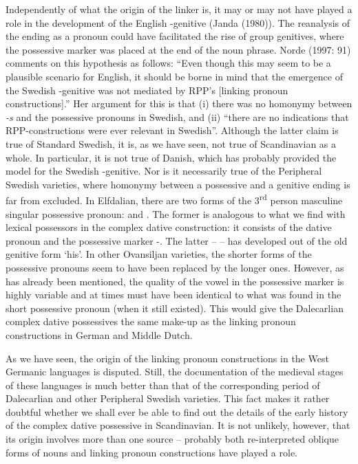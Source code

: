 Independently of what the origin of the linker is, it may or may not have played a role in the development of the English -genitive (Janda (1980)). The reanalysis of the ending as a pronoun could have facilitated the rise of group genitives, where the possessive marker was placed at the end of the noun phrase. Norde (1997: 91) comments on this hypothesis as follows: “Even though this may seem to be a plausible scenario for English, it should be borne in mind that the emergence of the Swedish -genitive was not mediated by RPP’s [linking pronoun constructions].” Her argument for this is that (i) there was no homonymy between\textit{ {}-s} and the possessive pronouns in Swedish, and (ii) “there are no indications that RPP-constructions were ever relevant in Swedish”. Although the latter claim is true of Standard Swedish, it is, as we have seen, not true of Scandinavian as a whole. In particular, it is not true of Danish, which has probably provided the model for the Swedish -genitive. Nor is it necessarily true of the Peripheral Swedish varieties, where homonymy between a possessive and a genitive ending is far from excluded. In Elfdalian, there are two forms of the 3\textsuperscript{rd} person masculine singular possessive pronoun:  and . The former is analogous to what we find with lexical possessors in the complex dative construction: it consists of the dative pronoun  and the possessive marker \nobreakdash-. The latter –  – has developed out of the old genitive form  ‘his’. In other Ovansiljan varieties, the shorter forms of the possessive pronouns seem to have been replaced by the longer ones. However, as has already been mentioned, the quality of the vowel in the possessive marker is highly variable and at times must have been identical to what was found in the short possessive pronoun (when it still existed). This would give the Dalecarlian complex dative possessives the same make-up as the linking pronoun constructions in German and Middle Dutch. 

As we have seen, the origin of the linking pronoun constructions in the West Germanic languages is disputed. Still, the documentation of the medieval stages of these languages is much better than that of the corresponding period of Dalecarlian and other Peripheral Swedish varieties. This fact makes it rather doubtful whether we shall ever be able to find out the details of the early history of the complex dative possessive in Scandinavian. It is not unlikely, however, that its origin involves more than one source – probably both re-interpreted oblique forms of nouns and linking pronoun constructions have played a role. 

